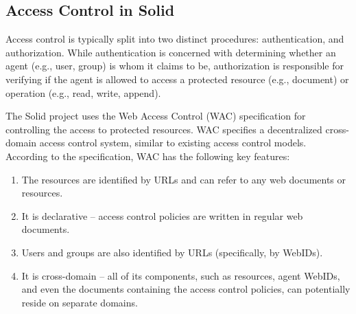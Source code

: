 \documentclass[sigconf]{acmart}
\begin{document}
\subsection{Access Control in Solid}

Access control is typically split into two distinct procedures: authentication, and authorization. While authentication is concerned with determining whether an agent (e.g., user, group) is whom it claims to be, authorization is responsible for verifying if the agent is allowed to access a protected resource (e.g., document) or operation (e.g., read, write, append).

The Solid project uses the Web Access Control (WAC) specification for controlling the access to protected resources. WAC specifies a decentralized cross-domain access control system, similar to existing access control models. According to the specification, WAC has the following key features:

\begin{enumerate}
\item The resources are identified by URLs and can refer to any web documents or resources.
\item It is declarative -- access control policies are written in regular web documents.
\item Users and groups are also identified by URLs (specifically, by WebIDs).
\item It is cross-domain -- all of its components, such as resources, agent WebIDs, and even the documents containing the access control policies, can potentially reside on separate domains.
\end{enumerate}
\end{document}
